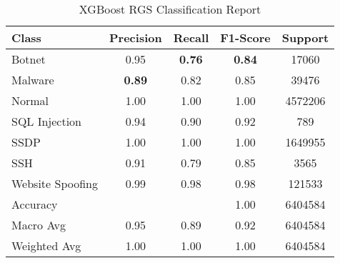 \begin{table}[htbp]
  \centering
  \caption{XGBoost RGS Classification Report}
  \label{tab:optimised_xgboost}
    \begin{tabular}{lcccc}
    \toprule
    Class & Precision & Recall & F1-Score & Support \\
    \midrule
    Botnet & 0.95 & {\color{red}\bfseries 0.76} & {\color{red}\bfseries 0.84} & 17060 \\
    Malware & {\color{red}\bfseries 0.89} & 0.82 & 0.85 & 39476 \\
    Normal & 1.00 & 1.00 & 1.00 & 4572206 \\
    SQL Injection & 0.94 & 0.90 & 0.92 & 789 \\
    SSDP & 1.00 & 1.00 & 1.00 & 1649955 \\
    SSH & 0.91 & 0.79 & 0.85 & 3565 \\
    Website Spoofing & 0.99 & 0.98 & 0.98 & 121533 \\
    \midrule
    Accuracy & & & 1.00 & 6404584 \\
    Macro Avg & 0.95 & 0.89 & 0.92 & 6404584 \\
    Weighted Avg & 1.00 & 1.00 & 1.00 & 6404584 \\
    \bottomrule
    \end{tabular}%
\end{table}%


